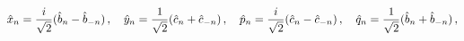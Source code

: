 \begin{equation}
\hat{x}_{n}={\frac{i}{\sqrt{2}}}(\hat{b}_{n}-\hat{b}_{-n})\,,\quad \hat{y}%
_{n}={\frac{1}{\sqrt{2}}}(\hat{c}_{n}+\hat{c}_{-n})\,,\quad \hat{p}_{n}={%
\frac{i}{\sqrt{2}}}(\hat{c}_{n}-\hat{c}_{-n})\,,\quad \hat{q}_{n}={\frac{1}{%
\sqrt{2}}}(\hat{b}_{n}+\hat{b}_{-n})\,,
\end{equation}


